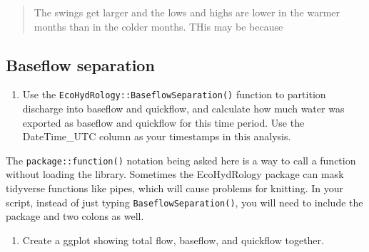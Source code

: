 \documentclass[]{article}
\providecommand{\tightlist}{%
  \setlength{\itemsep}{0pt}\setlength{\parskip}{0pt}}
\begin{document}
\begin{quote}
The swings get larger and the lows and highs are lower in the warmer
months than in the colder months. THis may be because
\end{quote}

\hypertarget{baseflow-separation}{%
\subsection{Baseflow separation}\label{baseflow-separation}}

\begin{enumerate}
\def\labelenumi{\arabic{enumi}.}
\setcounter{enumi}{8}
\tightlist
\item
  Use the \texttt{EcoHydRology::BaseflowSeparation()} function to
  partition discharge into baseflow and quickflow, and calculate how
  much water was exported as baseflow and quickflow for this time
  period. Use the DateTime\_UTC column as your timestamps in this
  analysis.
\end{enumerate}

The \texttt{package::function()} notation being asked here is a way to
call a function without loading the library. Sometimes the EcoHydRology
package can mask tidyverse functions like pipes, which will cause
problems for knitting. In your script, instead of just typing
\texttt{BaseflowSeparation()}, you will need to include the package and
two colons as well.

\begin{enumerate}
\def\labelenumi{\arabic{enumi}.}
\setcounter{enumi}{9}
\tightlist
\item
  Create a ggplot showing total flow, baseflow, and quickflow together.
\end{enumerate}
\end{document}
